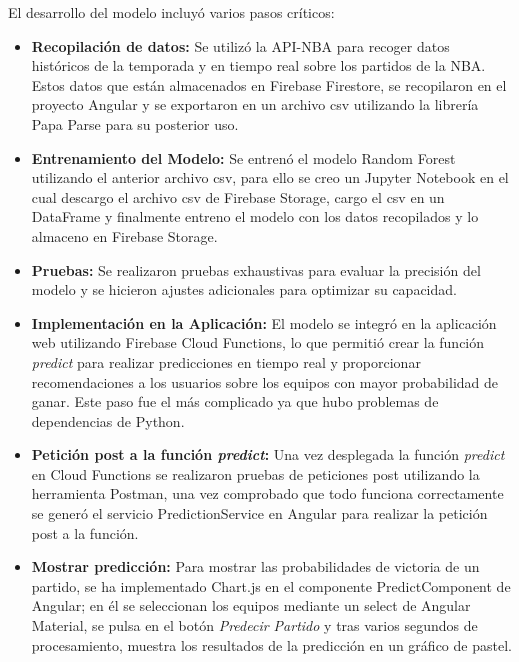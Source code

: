 El desarrollo del modelo incluyó varios pasos críticos:
\begin{itemize}
\tightlist
    \item 
        \textbf{Recopilación de datos:} Se utilizó la API-NBA para recoger datos históricos de la temporada y en tiempo real sobre los partidos de la NBA. Estos datos que están almacenados en Firebase Firestore, se recopilaron en el proyecto Angular y se exportaron en un archivo csv utilizando la librería Papa Parse \cite{papaparse} para su posterior uso.
    \item 
        \textbf{Entrenamiento del Modelo:} Se entrenó el modelo Random Forest utilizando el anterior archivo csv, para ello se creo un Jupyter Notebook en el cual descargo el archivo csv de Firebase Storage, cargo el csv en un DataFrame y finalmente entreno el modelo con los datos recopilados y lo almaceno en Firebase Storage.
    \item 
        \textbf{Pruebas:} Se realizaron pruebas exhaustivas para evaluar la precisión del modelo y se hicieron ajustes adicionales para optimizar su capacidad.
    \item 
        \textbf{Implementación en la Aplicación:} El modelo se integró en la aplicación web utilizando Firebase Cloud Functions, lo que permitió crear la función \textit{predict} para realizar predicciones en tiempo real y proporcionar recomendaciones a los usuarios sobre los equipos con mayor probabilidad de ganar. Este paso fue el más complicado ya que hubo problemas de dependencias de Python.
    \item 
        \textbf{Petición post a la función \textit{predict}:} Una vez desplegada la función \textit{predict} en Cloud Functions se realizaron pruebas de peticiones post utilizando la herramienta Postman, una vez comprobado que todo funciona correctamente se generó el servicio PredictionService en Angular para realizar la petición post a la función.
    \item 
        \textbf{Mostrar predicción:} Para mostrar las probabilidades de victoria de un partido, se ha implementado Chart.js en el componente PredictComponent de Angular; en él se seleccionan los equipos mediante un select de Angular Material, se pulsa en el botón \textit{Predecir Partido} y tras varios segundos de procesamiento, muestra los resultados de la predicción en un gráfico de pastel.
\end{itemize}

